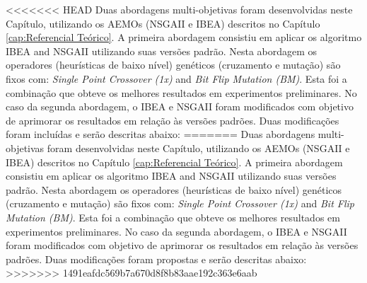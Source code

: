 <<<<<<< HEAD
Duas abordagens multi-objetivas foram desenvolvidas neste Capítulo, utilizando os AEMOs (NSGAII e IBEA) descritos no Capítulo \ref{cap:Referencial Teórico}. A primeira abordagem consistiu em aplicar os algoritmo IBEA and NSGAII utilizando suas versões padrão. Nesta abordagem os operadores (heurísticas de baixo nível) genéticos (cruzamento e mutação) são fixos com: \textit{Single Point Crossover (1x)} and \textit{Bit Flip Mutation (BM)}. Esta foi a combinação que obteve os melhores resultados em experimentos preliminares. No caso da segunda abordagem, o IBEA e NSGAII foram modificados com objetivo de aprimorar os resultados em relação às versões padrões. Duas modificações foram incluídas e serão descritas abaixo:
=======
Duas abordagens multi-objetivas foram desenvolvidas neste Capítulo, utilizando os AEMOs (NSGAII e IBEA) descritos no Capítulo \ref{cap:Referencial Teórico}. A primeira abordagem consistiu em aplicar os algoritmo IBEA and NSGAII utilizando suas versões padrão. Nesta abordagem os operadores (heurísticas de baixo nível) genéticos (cruzamento e mutação) são fixos com: \textit{Single Point Crossover (1x)} and \textit{Bit Flip Mutation (BM)}. Esta foi a combinação que obteve os melhores resultados em experimentos preliminares. No caso da segunda abordagem, o IBEA e NSGAII foram modificados com objetivo de aprimorar os resultados em relação às versões padrões. Duas modificações foram propostas e serão descritas abaixo:
>>>>>>> 1491eafdc569b7a670d8f8b83aae192c363e6aab

